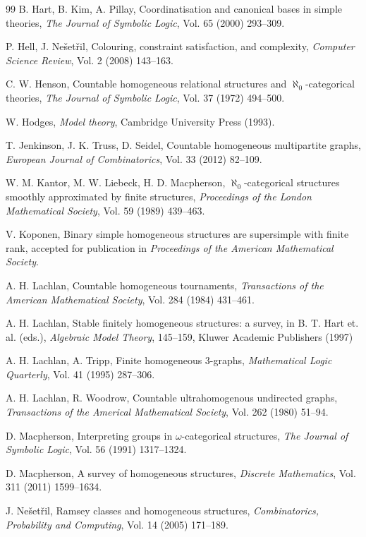 \documentclass[11pt, twoside]{amsart}
\numberwithin{equation}{section}
\begin{document}
\begin{thebibliography}{99}
 B. Hart, B. Kim, A. Pillay, Coordinatisation and canonical bases in simple theories,
{\em The Journal of Symbolic Logic}, Vol. 65 (2000) 293--309.

 P. Hell, J. Ne\v{s}et\v{r}il, Colouring, constraint satisfaction, and complexity,
{\em Computer Science Review}, Vol. 2 (2008) 143--163.

 C. W. Henson, Countable homogeneous relational structures and $\aleph_0$-categorical theories,
{\em The Journal of Symbolic Logic}, Vol. 37 (1972) 494--500.

 W. Hodges,  {\em Model theory}, Cambridge University Press (1993).

 T. Jenkinson, J. K. Truss, D. Seidel, Countable homogeneous multipartite graphs, 
{\em European Journal of Combinatorics}, Vol. 33 (2012) 82--109. 

 W. M. Kantor, M. W. Liebeck, H. D. Macpherson, 
$\aleph_0$-categorical structures smoothly approximated by finite structures,
{\em Proceedings of the London Mathematical Society}, Vol. 59 (1989) 439--463.

 V. Koponen, Binary simple homogeneous structures are supersimple with finite rank,
accepted for publication in {\em Proceedings of the American Mathematical Society}.

 A. H. Lachlan, Countable homogeneous tournaments,
{\em Transactions of the American Mathematical Society}, Vol. 284 (1984) 431--461.

 A. H. Lachlan, Stable finitely homogeneous structures: a survey,
in B. T. Hart et. al. (eds.), {\em Algebraic Model Theory}, 145--159, Kluwer Academic Publishers (1997) 

 A. H. Lachlan, A. Tripp, Finite homogeneous 3-graphs, 
{\em Mathematical Logic Quarterly}, Vol. 41 (1995) 287--306.

 A. H. Lachlan, R. Woodrow,  Countable ultrahomogenous undirected graphs,
{\em Transactions of the Americal Mathematical Society}, Vol. 262 (1980) 51--94.

 D. Macpherson, Interpreting groups in $\omega$-categorical structures,
{\em The Journal of Symbolic Logic}, Vol. 56 (1991) 1317--1324.

 D. Macpherson, A survey of homogeneous structures,
{\em Discrete Mathematics}, Vol. 311 (2011) 1599--1634.

 J. Ne\v{s}et\v{r}il, Ramsey classes and homogeneous structures,
 {\em Combinatorics, Probability and Computing}, Vol. 14 (2005) 171--189.


\end{thebibliography}
\end{document}
